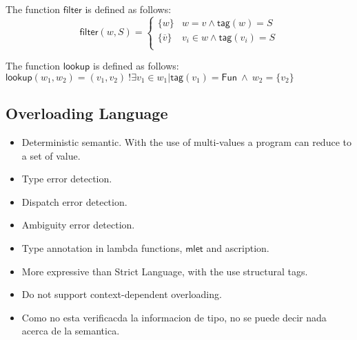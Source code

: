 \documentclass[preprint,authoryear,sort&compress,9pt,nocopyrightspace]{article}
\newcommand{\lab}{\mathsf{tag}}
\newcommand{\funt}{\mathsf{Fun}}
\newcommand{\filtrar}{\mathsf{filter}}
\newcommand{\buscar}{\mathsf{lookup}}
\newcommand{\semanticC}{Strict Language}
\newcommand{\semanticD}{Overloading Language}
\begin{document}
\begin{definition}[$\filtrar(\cdot, \cdot)$]
\label{definition:tcs}
\mbox{}
The function $\filtrar$ is defined  as follows:
\[ \filtrar(w, S) = \begin{cases}
 \{w\} & w = v \wedge \lab(w) = S\\
 \{\overline{v}\} & v_i \in w \wedge \lab(v_i) = S \\
 \end{cases} 
\]
\end{definition}

\begin{definition}[$\buscar$]
\label{definition:tcs}
\mbox{}
The function $\buscar$ is defined  as follows:\\
 $\buscar(w_1, w_2) = (v_1, v_2)  \  !\exists v_1 \in w_1|\lab(v_1) = \funt \ \wedge \ w_2 = \{ v_2 \}$
 \end{definition}


 
\subsection{\semanticD}
\begin{itemize}
\item Deterministic semantic. With the use of multi-values a program can reduce to a set of value.
\item Type error detection.
\item Dispatch error detection.
\item Ambiguity error detection.
\item Type annotation in lambda functions, $\mathsf{mlet}$ and ascription.
\item More expressive than \semanticC, with the use structural tags.
\item Do not support context-dependent overloading.
\item Como no esta verificacda la informacion de tipo, no se puede decir nada acerca de la semantica.
\end{itemize}
\end{document}
